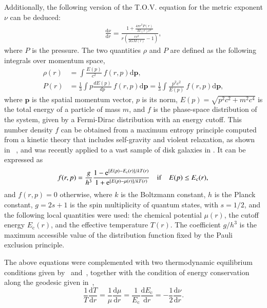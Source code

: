 \documentclass[referee]{aa} %
\begin{document}
Additionally, the following version of the T.O.V. equation for the metric exponent $\nu$ can be deduced:
\begin{align}
   \label{tov}
    \frac{\mathrm{d}\nu}{\mathrm{d}r}= \frac{1+ \frac{\displaystyle 4\pi r^3 P(r)}{\displaystyle M(r)c^2}}{r\left(\frac{\displaystyle rc^2}{\displaystyle 2GM(r)} -1\right)},
\end{align}
where $P$ is the pressure.
The two quantities $\rho$ and $P$ are defined as the following integrals over momentum space,
\begin{align}
     \label{dens_press}
      \rho(r)&=\int \frac{E(p)}{c^2}~f(r,p)\mathrm{d}\boldsymbol{p},\\
      P(r)&=\frac{1}{3}\int p\frac{dE(p)}{dp}~f(r,p)\mathrm{d}\boldsymbol{p}=
                \frac{1}{3}\int \frac{p^2c^2}{E(p)}~f(r,p)\mathrm{d}\boldsymbol{p},
\end{align}
where $\boldsymbol{p}$ is the spatial momentum  vector, $p$ is its norm, $E(p)=\sqrt{p^2c^2+m^2c^4}$ is the total energy of a particle of mass $m$, and $f$ is the phase-space distribution of the system, given by a Fermi-Dirac distribution with an energy cutoff. This number density $f$ can be obtained from a maximum entropy principle computed from a kinetic theory that includes self-gravity and violent relaxation, as shown in \citealp{2004PhyA..332...89C}~\citep[for a review see also][]{2022PhyA..60628089C}, and was recently applied to a vast sample of disk galaxies in \cite{2023ApJ...945....1K}. It can be expressed as
\begin{equation}
f(r,p)=
    \frac{g}{h^3}
      \frac{1-\mathrm{e}^{[E(p)-E_\mathrm{c}(r)]/kT(r)}}
      {1+\mathrm{e}^{[E(p)-\mu(r)]/kT(r)}}\quad\mathrm{if}\quad E(p) \leq E_\mathrm{c}(r),\\
\end{equation}
and $f(r,p)=0$ otherwise,
where $k$ is the Boltzmann constant, $h$ is the Planck constant, $g=2s+1$ is the spin multiplicity of quantum states, with $s=1/2$, and the following local quantities were used: the chemical potential $\mu(r)$, the cutoff energy $E_\mathrm{c}(r)$,  and the effective temperature $T(r)$.
The coefficient $g/h^3$ is the maximum accessible value of the distribution function fixed by the Pauli exclusion principle.

The above equations were complemented with two thermodynamic equilibrium conditions given
by~\citet{PhysRev.35.904} and~\citet{RevModPhys.21.531}, together with the condition of energy conservation
along the geodesic given in~\citet{1989A&A...221....4M},
\begin{equation}
    \label{tke}
   \frac{1}{T}\frac{\mathrm{d}T}{\mathrm{d}r}=\frac{1}{\mu}\frac{\mathrm{d}\mu}{\mathrm{d}r}=
   \frac{1}{E_\mathrm{c}}\frac{\mathrm{d} E_\mathrm{c}}{\mathrm{d}r}=-\frac{1}{2}\frac{\mathrm{d}\nu}{\mathrm{d}r}.
\end{equation}
\end{document}
